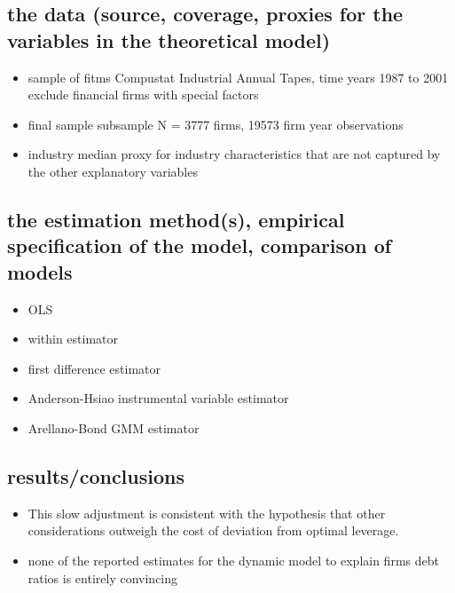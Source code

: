 \documentclass[document.tex]{subfiles}
\begin{document}
\subsection{ the data (source, coverage, proxies for the variables in the theoretical model)  }
\begin{itemize}
\item sample of fitms Compustat Industrial Annual Tapes, time years 1987 to 2001 exclude financial firms with special factors
\item final sample subsample N = 3777 firms, 19573 firm year observations
\item industry median proxy for industry characteristics that are not captured by the other explanatory variables
\end{itemize}
\subsection{ the estimation method(s), empirical specification of the model, comparison of models  }
\begin{itemize}
\item OLS 
\item within estimator
\item first difference estimator
\item Anderson-Hsiao instrumental variable estimator
\item Arellano-Bond GMM estimator
\end{itemize}
\subsection{ results/conclusions  }
\begin{itemize}
\item This slow adjustment is consistent with the hypothesis that other considerations outweigh the cost of deviation from optimal leverage.
\item none of the reported estimates for the dynamic model to explain firms debt ratios is entirely convincing
\end{itemize}
\end{document}
